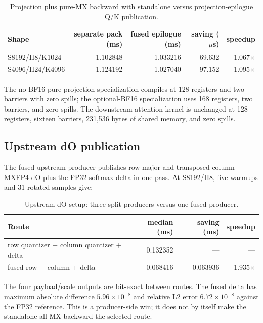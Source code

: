 \begin{table}[htbp]
\centering
\caption{Projection plus pure-MX backward with standalone versus
projection-epilogue Q/K publication.}
\label{tab:pure-single-quant-chain}
\small
\begin{tabular}{l rrrr}
\toprule
Shape & separate pack (ms) & fused epilogue (ms) & saving ($\mu$s) & speedup \\
\midrule
S8192/H8/K1024  & 1.102848 & 1.033216 & 69.632 & 1.067$\times$ \\
S4096/H24/K4096 & 1.124192 & 1.027040 & 97.152 & 1.095$\times$ \\
\bottomrule
\end{tabular}
\end{table}

The no-BF16 pure projection specialization compiles at 128 registers and two
barriers with zero spills; the optional-BF16 specialization uses 168
registers, two barriers, and zero spills.  The downstream attention kernel is
unchanged at 128 registers, sixteen barriers, 231,536 bytes of shared memory,
and zero spills.

\subsection{Upstream dO publication}

The fused upstream producer publishes row-major and transposed-column MXFP4
dO plus the FP32 softmax delta in one pass.  At S8192/H8, five warmups and 31
rotated samples give:

\begin{table}[htbp]
\centering
\caption{Upstream dO setup: three split producers versus one fused producer.}
\label{tab:upstream-dout}
\small
\begin{tabular}{l rr r}
\toprule
Route & median (ms) & saving (ms) & speedup \\
\midrule
row quantizer + column quantizer + delta & 0.132352 & --- & --- \\
fused row + column + delta               & 0.068416 & 0.063936 & 1.935$\times$ \\
\bottomrule
\end{tabular}
\end{table}

The four payload/scale outputs are bit-exact between routes.  The fused delta
has maximum absolute difference $5.96\times10^{-8}$ and relative L2 error
$6.72\times10^{-8}$ against the FP32 reference.  This is a producer-side win;
it does not by itself make the standalone all-MX backward the selected route.

